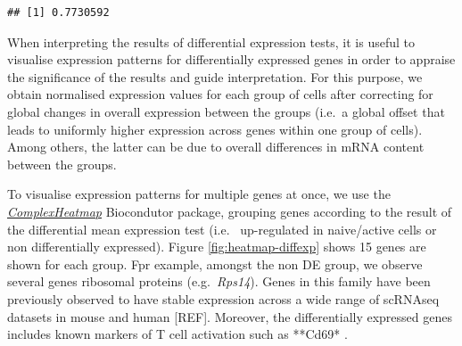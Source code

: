 \documentclass[9pt,a4paper,]{extarticle}
\newenvironment{Shaded}{\begin{snugshade}}{\end{snugshade}}
\newcommand{\CommentTok}[1]{\textcolor[rgb]{0.56,0.35,0.01}{\textit{#1}}}
\newcommand{\KeywordTok}[1]{\textcolor[rgb]{0.13,0.29,0.53}{\textbf{#1}}}
\newcommand{\NormalTok}[1]{#1}
\newcommand{\OperatorTok}[1]{\textcolor[rgb]{0.81,0.36,0.00}{\textbf{#1}}}
\newcommand{\StringTok}[1]{\textcolor[rgb]{0.31,0.60,0.02}{#1}}
\begin{document}
\begin{verbatim}
## [1] 0.7730592
\end{verbatim}

\begin{Shaded}
\end{Shaded}

When interpreting the results of differential expression tests, it is useful
to visualise expression patterns for differentially expressed genes in order to
appraise the significance of the results and guide interpretation.
For this purpose, we obtain normalised expression values for each group of
cells after correcting for global changes in overall expression between the
groups (i.e.~a global offset that leads to uniformly higher expression across
genes within one group of cells).
Among others, the latter can be due to overall differences in mRNA content
between the groups.

To visualise expression patterns for multiple genes at once, we use the
\emph{\href{https://bioconductor.org/packages/3.11/ComplexHeatmap}{ComplexHeatmap}} \citep{Gu2016} Biocondutor package, grouping genes
according to the result of the differential mean expression test (i.e.~
up-regulated in naive/active cells or non differentially expressed).
Figure \ref{fig:heatmap-diffexp} shows 15 genes are shown for each group.
Fpr example, amongst the non DE group, we observe several genes ribosomal
proteins (e.g.~\emph{Rps14}).
Genes in this family have been previously observed to have stable expression
across a wide range of scRNAseq datasets in mouse and human {[}REF{]}.
Moreover, the differentially expressed genes includes known markers of T cell
activation such as **Cd69* \citep{Ziegler1994}.
\end{document}
